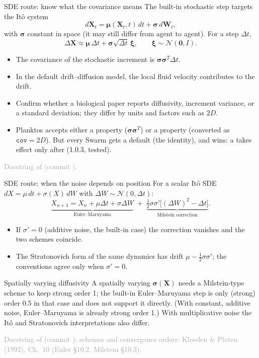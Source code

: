 \documentclass[aspectratio=169,11pt]{beamer}
\newcommand{\XX}{\bm{X}}
\newcommand{\sourcecredit}[1]{\vfill\begin{flushright}\tiny\textcolor{DarkGray}{#1}\end{flushright}}
\begin{document}
\begin{frame}{SDE route: know what the covariance means}
The built-in stochastic step targets the It\^o system
\[
  d\XX_t=\bm\mu(\XX_t,t)\,dt+\bm\sigma\,d\bm W_t,
\]
with $\bm\sigma$ constant in space (it may still differ from agent to agent). For a step $\Delta t$,
\[
  \Delta\XX\approx\bm\mu\,\Delta t+\bm\sigma\sqrt{\Delta t}\,\bm\xi,
  \qquad \bm\xi\sim\mathcal N(\bm0,I).
\]
\begin{itemize}
  \item The covariance of the stochastic increment is $\bm\sigma\bm\sigma^{T}\Delta t$.
  \item In the default drift--diffusion model, the local fluid velocity contributes to the drift.
  \item Confirm whether a biological paper reports diffusivity, increment variance, or a standard deviation; they differ by units and factors such as $2D$.
  \item Planktos accepts either a  property ($\bm\sigma\bm\sigma^T$) or a  property (converted as $\texttt{cov}=2D$). But every Swarm gets a default  (the identity), and  wins: a  takes effect only after  (1.0.3, tested).
\end{itemize}
\sourcecredit{Docstring of  (commit \code{a1c2128}).}
\end{frame}

\begin{frame}{SDE route: when the noise depends on position}
For a scalar It\^o SDE $dX=\mu\,dt+\sigma(X)\,dW$ with $\Delta W\sim\mathcal N(0,\Delta t)$:
\[
  \underbrace{X_{n+1}=X_n+\mu\Delta t+\sigma\Delta W}_{\text{Euler--Maruyama}}
  \;+\;\underbrace{\tfrac12\sigma\sigma'\big[(\Delta W)^2-\Delta t\big]}_{\text{Milstein correction}} .
\]
\begin{itemize}
  \item If $\sigma'=0$ (additive noise, the built-in case) the correction vanishes and the two schemes coincide.
  \item The Stratonovich form of the same dynamics has drift $\mu-\tfrac12\sigma\sigma'$; the conventions agree only when $\sigma'=0$.
\end{itemize}
\begin{alertblock}{Spatially varying diffusivity}
A spatially varying $\bm\sigma(\XX)$ needs a Milstein-type scheme to keep strong order 1; the built-in Euler--Maruyama step is only (strong) order 0.5 in that case and does not support it directly. (With constant, additive noise, Euler--Maruyama is already strong order 1.) With multiplicative noise the It\^o and Stratonovich interpretations also differ.
\end{alertblock}
\sourcecredit{Docstring of  (commit \code{a1c2128}); schemes and convergence orders: Kloeden \& Platen (1992), Ch.~10 (Euler \S10.2, Milstein \S10.3).}
\end{frame}
\end{document}
